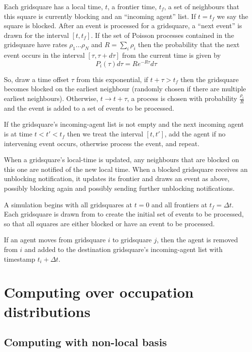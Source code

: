 \documentclass[a4paper]{article}
\begin{document}
Each gridsquare has a local time, $t$, a frontier time, $t_f$, a set of neighbours that this square is currently blocking and an ``incoming agent'' list. If $t=t_f$ we say the square is blocked. After an event is processed for a gridsquare, a ``next event'' is drawn for the interval $[t,t_f]$. If the set of Poisson processes contained in the gridsquare have rates $\rho_1...\rho_N$ and $R = \sum_i \rho_i$ then the probability that the next event occurs in the interval $[\tau, \tau+d\tau]$ from the current time is given by
\[
P_i(\tau)d\tau = Re^{-R\tau}d\tau
\]

So, draw a time offset $\tau$ from this exponential, if $t + \tau > t_f$ then the gridsquare becomes blocked on the earliest neighbour (randomly chosen if there are multiple earliest neighbours). Otherwise, $t \to t + \tau$, a process is chosen with probability $\frac{\rho_i}{R}$ and the event is added to a set of events to be processed.

If the gridsquare's incoming-agent list is not empty and the next incoming agent is at time  $t < t' < t_f$ then we treat the interval $[t, t']$, add the agent if no intervening event occurs, otherwise process the event, and repeat.

When a gridsquare's local-time is updated, any neighbours that are blocked on this one are notified of the new local time. When a blocked gridsquare receives an unblocking notification, it updates its frontier and draws an event as above, possibly blocking again and possibly sending further unblocking notifications.

A simulation begins with all gridsquares at $t=0$ and all frontiers at $t_f=\Delta t$. Each gridsquare is drawn from to create the initial set of events to be processed, so that all squares are either blocked or have an event to be processed.

If an agent moves from gridsquare $i$ to gridsquare $j$, then the agent is removed from $i$ and added to the destination gridsquare's incoming-agent list with timestamp $t_i + \Delta t$.

\section{Computing over occupation distributions}

\subsection{Computing with non-local basis}
\end{document}
